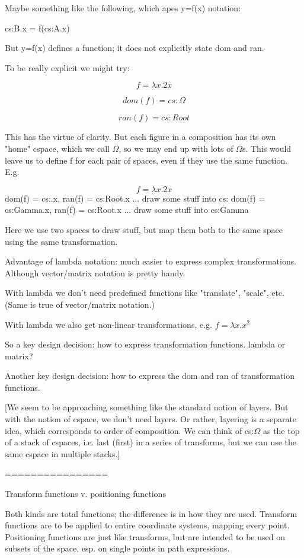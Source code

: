 \documentclass[12pt]{tufte-handout}
\numberwithin{equation}{subsection}
\numberwithin{equation}{subsection}
\begin{document}
  Maybe something like the following, which apes y=f(x) notation:

  cs:B.x = f(cs:A.x)

  But y=f(x) defines a function; it does not explicitly state dom and ran.

  To be really explicit we might try:

  $$f = \lambda x.2x$$

  $$dom(f) = cs:\Omega$$

  $$ran(f) = cs:Root$$

  This has the virtue of clarity.  But each figure in a composition has
  its own "home" cspace, which we call $\Omega$, so we may end up with lots
  of $\Omega$s.  This would leave us to define f for each pair of spaces,
  even if they use the same function.  E.g.


  $$f = \lambda x.2x$$
  dom(f) = cs:\Omega.x, ran(f) = cs:Root.x
  ... draw some stuff into cs:\Omega
  dom(f) = cs:Gamma.x, ran(f) = cs:Root.x
  ... draw some stuff into cs:Gamma

  Here we use two spaces to draw stuff, but map them both to the same
  space using the same transformation.

  Advantage of lambda notation: much easier to express complex
  transformations.  Although vector/matrix notation is pretty handy.

  With lambda we don't need predefined functions like "translate",
  "scale", etc.  (Same is true of vector/matrix notation.)

  With lambda we also get non-linear transformations, e.g.
  \(f = \lambda x.x^2\)

  So a key design decision: how to express transformation functions.
  lambda or matrix?

  Another key design decision: how to express the dom and ran of
  transformation functions.

  [We seem to be approaching something like the standard notion of
    layers.  But with the notion of cspace, we don't need layers.  Or
    rather, layering is a separate idea, which corresponds to order of
    composition.  We can think of cs:$\Omega$ as the top of a stack of
    cspaces, i.e. last (first) in a series of transforms, but we can use
    the same cspace in multiple stacks.]

  ================

  Transform functions v. positioning functions

  Both kinds are total functions; the difference is in how they are
  used.  Transform functions are to be applied to entire coordinate
  systems, mapping every point.  Positioning functions are just like
  transforms, but are intended to be used on subsets of the space,
  esp. on single points in path expressions.
\end{document}
